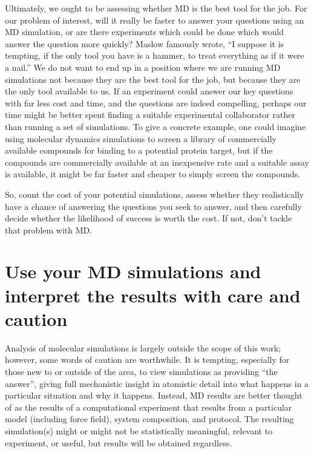 \documentclass[9pt,bestpractices]{livecoms}
\begin{document}
Ultimately, we ought to be assessing whether MD is the best tool for the job.
For our problem of interest, will it really be faster to answer your questions using an MD simulation, or are there experiments which could be done which would answer the question more quickly? 
Maslow famously wrote, ``I suppose it is tempting, if the only tool you have is a hammer, to treat everything as if it were a nail.''
We do not want to end up in a position where we are running MD simulations not because they are the best tool for the job, but because they are the only tool available to us.
If an experiment could answer our key questions with far less cost and time, and the questions are indeed compelling, perhaps our time might be better spent finding a suitable experimental collaborator rather than running a set of simulations.
To give a concrete example, one could imagine using molecular dynamics simulations to screen a library of commercially available compounds for binding to a potential protein target, but if the compounds are commercially available at an inexpensive rate and a suitable assay is available, it might be far faster and cheaper to simply screen the compounds.

So, count the cost of your potential simulations, assess whether they realistically have a chance of answering the questions you seek to answer, and then carefully decide whether the likelihood of success is worth the cost. 
If not, don't tackle that problem with MD.

\section{Use your MD simulations and interpret the results with care and caution}

Analysis of molecular simulations is largely outside the scope of this work; however, some words of caution are worthwhile.
It is tempting, especially for those new to or outside of the area, to view simulations as providing ``the answer'', giving full mechanistic insight in atomistic detail into what happens in a particular situation and why it happens.
Instead, MD results are better thought of as the results of a computational experiment that results from a particular model (including force field), system composition, and protocol.
The resulting simulation(s) might or might not be statistically meaningful, relevant to experiment, or useful, but results will be obtained regardless.
\end{document}
